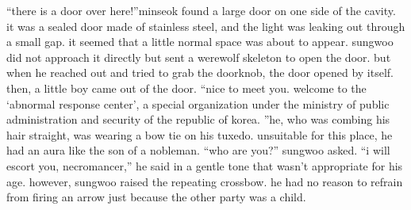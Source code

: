 “there is a door over here!”minseok found a large door on one side of the cavity.
 it was a sealed door made of stainless steel, and the light was leaking out through a small gap.
 it seemed that a little normal space was about to appear.
sungwoo did not approach it directly but sent a werewolf skeleton to open the door.
but when he reached out and tried to grab the doorknob, the door opened by itself.
then, a little boy came out of the door.
“nice to meet you.
 welcome to the ‘abnormal response center’, a special organization under the ministry of public administration and security of the republic of korea.
”he, who was combing his hair straight, was wearing a bow tie on his tuxedo.
unsuitable for this place, he had an aura like the son of a nobleman.
“who are you?” sungwoo asked.
“i will escort you, necromancer,” he said in a gentle tone that wasn’t appropriate for his age.
 however, sungwoo raised the repeating crossbow.
 he had no reason to refrain from firing an arrow just because the other party was a child.

